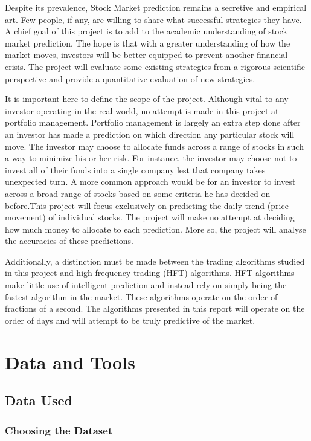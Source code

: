 \documentclass{report}
\begin{document}
Despite its prevalence, Stock Market prediction remains a secretive and empirical art. Few people, if any, are willing to share what  successful strategies they have. A chief goal of this project is to add to the academic understanding of stock market prediction. The hope is that with a greater understanding of how the market moves, investors will be better equipped to prevent another financial crisis. The project will evaluate some existing strategies from a rigorous scientific perspective and provide a quantitative evaluation of new strategies. 

It is important here to define the scope of the project. Although vital to any investor operating in the real world, no attempt is made in this project at portfolio management. Portfolio management is largely an extra step done after an investor has made a prediction on which direction any particular stock will move. The investor may choose to allocate funds across a range of stocks in such a way to minimize his or her risk. For instance, the investor may choose not to invest all of their funds into a single company lest that company takes unexpected turn. A more common approach would be for an investor to invest across a broad range of stocks based on some criteria he has decided on before.This project will focus exclusively on predicting the daily trend (price movement) of individual stocks. The project will make no attempt at deciding how much money to allocate to each prediction.  More so, the project will analyse the accuracies of these predictions. 

Additionally, a distinction must be made between the trading algorithms studied in this project and high frequency trading (HFT) algorithms. HFT algorithms make little use of intelligent prediction and instead rely on simply being the fastest algorithm in the market. These algorithms operate on the order of fractions of a second. The algorithms presented in this report will operate on the order of days and will attempt to be truly predictive of the market.  

\chapter{Data and Tools}

\section{Data Used}

\subsection{Choosing the Dataset}
\end{document}
